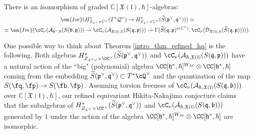 \documentclass[12pt]{amsart}
\begin{document}
\begin{theorem}\label{intro_thm_refined_hn}
There is an isomorphism of graded $\mathbb{C}[\mathfrak{X}(\mathfrak{l}),\hbar]$-algebras:
\begin{multline}\label{eq_our_refined_iso}
\on{Im}(H^*_{Z_{L^\vee} \times \mathbb{C}^{\times}}(T^*\mathcal{Q}^\vee) \rightarrow H^*_{Z_{L^\vee} \times \mathbb{C}^\times}(\widetilde{S}(\mathfrak{p}^\vee,\mathfrak{q}^\vee))) \simeq \\ \simeq \on{Im}(\cC_\nu(\mathcal{A}_{\mathfrak{h}^*,\hbar}(S(\mathfrak{b},\mathfrak{p}))) \rightarrow \cC_\nu(\mathcal{A}_{\mathfrak{X}(\mathfrak{l}),\hbar}(S(\mathfrak{q},\mathfrak{p}))) \rightarrow \Gamma(\widetilde{S}(\mathfrak{q},\mathfrak{p})^{\nu(\mathbb{C}^\times)},\cC_\nu(\mathcal{D}_{\mathfrak{X}(\mathfrak{l}),\hbar}(\widetilde{S}(\mathfrak{q},\mathfrak{p}))))).
\end{multline}
\end{theorem}




One possible way to think about Theorem \ref{intro_thm_refined_hn} is the following. 
Both algebras $H^*_{Z_{L^*\vee} \times \CC^\times}(\widetilde{S}(\mathfrak{p}^\vee,\mathfrak{q}^\vee))$ and $\cC_\nu(\mathcal{A}_{\hbar,\mathfrak{X}(\mathfrak{l})}({S}(\mathfrak{q},\mathfrak{p})))$ have a natural action of the ``big" (polynomial) algebra $\CC[\mathfrak{h}^*,\hbar]^{W_M} \otimes \CC[\mathfrak{h}^*,\hbar]$ coming from the embedding $\widetilde{S}(\mathfrak{p}^\vee,\mathfrak{q}^\vee)\subset T^*\cQ^\vee$ and the quantization of the map $S(\fq, \fp)\to S(\fb,\fp)$. Assuming torsion freeness of $\cC_\nu(\mathcal{A}_{\hbar,\mathfrak{X}(\mathfrak{l})}(S(\mathfrak{q},\mathfrak{b})))$ over $\mathbb{C}[\mathfrak{X}(\mathfrak{l}),\hbar]$, our refined equivariant Hikita-Nakajima conjecture claims that the subalgebras of $H^*_{Z_{L^\vee} \times \CC^\times}(\widetilde{S}(\mathfrak{p}^\vee,\mathfrak{q}^\vee))$ and $\cC_\nu(\mathcal{A}_{\hbar,\mathfrak{X}(\mathfrak{l})}(S(\mathfrak{q},\mathfrak{b})))$ generated by $1$ under the action of the algebra $\CC[\mathfrak{h}^*,\hbar]^{W_M} \otimes \CC[\mathfrak{h}^*,\hbar]$ are isomorphic. 
\end{document}
